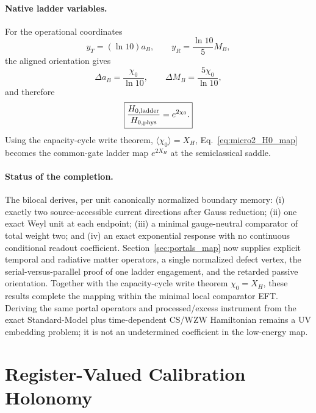 \documentclass[aps,prd,twocolumn,10pt,superscriptaddress,nofootinbib]{revtex4-2}
\begin{document}
\paragraph{Native ladder variables.}
For the operational coordinates
\begin{equation}
 y_T=(\ln10)a_B,
 \qquad
 y_R=\frac{\ln10}{5}M_B,
\end{equation}
the aligned orientation gives
\begin{equation}
 \Delta a_B=\frac{\chi_0}{\ln10},
 \qquad
 \Delta M_B=\frac{5\chi_0}{\ln10},
\end{equation}
and therefore
\begin{equation}
 \boxed{
 \frac{H_{0,\rm ladder}}{H_{0,\rm phys}}
 =e^{2\chi_0}.}
\label{eq:micro2_H0_map}
\end{equation}
Using the capacity-cycle write theorem,
$\langle\chi_0\rangle=X_H$, Eq.~\eqref{eq:micro2_H0_map} becomes the
common-gate ladder map $e^{2X_H}$ at the semiclassical saddle.

\paragraph{Status of the completion.}
The bilocal derives, per unit canonically normalized boundary memory:
(i) exactly two source-accessible current directions after Gauss reduction;
(ii) one exact Weyl unit at each endpoint; (iii) a minimal gauge-neutral
comparator of total weight two; and (iv) an exact exponential response with
no continuous conditional readout coefficient.  Section~\ref{sec:portals_map}
now supplies explicit temporal and radiative matter operators, a single
normalized defect vertex, the serial-versus-parallel proof of one ladder
engagement, and the retarded passive orientation.  Together with the
capacity-cycle write theorem $\chi_0=X_H$, these results complete the
mapping within the minimal local comparator EFT.  Deriving the same portal
operators and processed/excess instrument from the exact Standard-Model
plus time-dependent CS/WZW Hamiltonian remains a UV embedding problem; it is
not an undetermined coefficient in the low-energy map.


\section{Register-Valued Calibration Holonomy}
\label{sec:calibration_holonomy}
\end{document}
